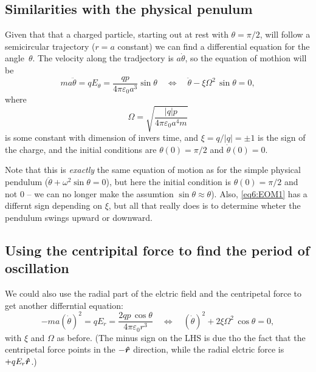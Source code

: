 \documentclass[11pt,a4paper, 
swedish, english %
]{article}
\begin{document}
\subsection*{Similarities with the physical penulum}
Given that that a charged particle, starting out at rest with
$\theta=\pi/2$, will follow a semicircular\footnotemark{} trajectory
($r=a$ constant) we can find a differential equation for the
angle~$\theta$. The velocity along the tradjectory is $a\dot\theta$,
so the equation of mothion will be
\begin{equation}\label{eq6:EOM1}
ma\ddot\theta = qE_\theta = \frac{qp}{4\pi\varepsilon_0 a^3}\sin\theta
\quad\Longleftrightarrow\quad
\ddot\theta - \xi\Omega^2\,\sin\theta=0,
\end{equation}
where
\begin{equation}\label{eq6:Omega}
\Omega= \sqrt{\frac{|q|p}{4\pi\varepsilon_0 a^4m}}
\end{equation}
is some constant with dimension of invers time,
and $\xi=q/|q|=\pm1$ is the sign of the charge, and the initial
conditions are $\theta(0)=\pi/2$ and $\dot\theta(0)=0$.

Note that this is \emph{exactly} the same equation of motion as for
the simple physical pendulum ($\ddot\theta + \omega^2\sin\theta=0$),
but here the initial condition is $\theta(0)=\pi/2$ and not 0 -- we
can no longer make the assumtion $\sin\theta\approx\theta$). Also,
\eqref{eq6:EOM1} has a differnt sign 
depending on $\xi$, but all that really does is to determine wheter
the pendulum swings upward or downward. 

\subsection*{Using the centripital force to find the period of oscillation}
We could also use the radial part of the elctric field and the
centripetal force to get another differntial equation:
\begin{equation}\label{eq6:EOM2}
-ma(\dot\theta)^2 = qE_r
=\frac{2qp\,\cos\theta}{4\pi\varepsilon_0 r^3}
\quad\Longleftrightarrow\quad
(\dot\theta)^2 + 2\xi\Omega^2\,\cos\theta=0,
\end{equation}
with $\xi$ and $\Omega$ as before. (The minus sign on the LHS is due
tho the fact that the centripetal force points in the $-\vu*r$
direction, while the radial elctric force is $+qE_r\vu*r$.)
\end{document}
